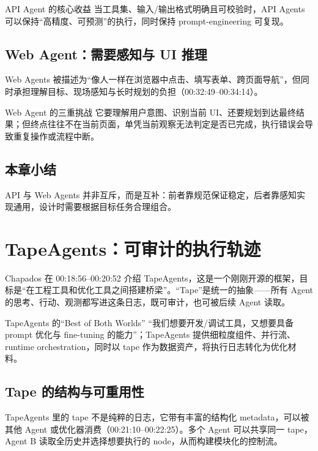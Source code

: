\documentclass[a4paper]{article}
\begin{document}
\begin{knowledgebox}{API Agent 的核心收益}
当工具集、输入/输出格式明确且可校验时，API Agents 可以保持“高精度、可预测”的执行，同时保持 prompt-engineering 可复现。
\end{knowledgebox}

\subsection{Web Agent：需要感知与 UI 推理}
Web Agents 被描述为“像人一样在浏览器中点击、填写表单、跨页面导航”，但同时承担理解目标、现场感知与长时规划的负担（00:32:49--00:34:14）。

\begin{warningbox}{Web Agent 的三重挑战}
它要理解用户意图、识别当前 UI、还要规划到达最终结果；但终点往往不在当前页面，单凭当前观察无法判定是否已完成，执行错误会导致重复操作或流程中断。
\end{warningbox}

\subsection{本章小结}
API 与 Web Agents 并非互斥，而是互补：前者靠规范保证稳定，后者靠感知实现通用，设计时需要根据目标任务合理组合。

\section{TapeAgents：可审计的执行轨迹}
Chapados 在 00:18:56--00:20:52 介绍 TapeAgents，这是一个刚刚开源的框架，目标是“在工程工具和优化工具之间搭建桥梁”。“Tape”是统一的抽象——所有 Agent 的思考、行动、观测都写进这条日志，既可审计，也可被后续 Agent 读取。

\begin{importantbox}{TapeAgents 的“Best of Both Worlds”}
``我们想要开发/调试工具，又想要具备 prompt 优化与 fine-tuning 的能力''；TapeAgents 提供细粒度组件、并行流、runtime orchestration，同时以 tape 作为数据资产，将执行日志转化为优化材料。
\end{importantbox}

\subsection{Tape 的结构与可重用性}
TapeAgents 里的 tape 不是纯粹的日志，它带有丰富的结构化 metadata，可以被其他 Agent 或优化器消费（00:21:10--00:22:25）。多个 Agent 可以共享同一 tape，Agent B 读取全历史并选择想要执行的 node，从而构建模块化的控制流。
\end{document}
